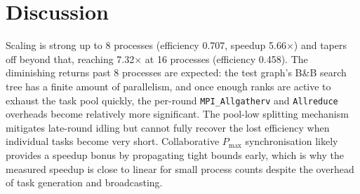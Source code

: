 \documentclass[11pt,a4paper]{article}
\begin{document}
  \section{Discussion}

  Scaling is strong up to 8 processes (efficiency 0.707, speedup 5.66$\times$)
  and tapers off beyond that, reaching 7.32$\times$ at 16 processes
  (efficiency 0.458).  The diminishing returns past 8 processes are expected:
  the test graph's B\&B search tree has a finite amount of parallelism, and once
  enough ranks are active to exhaust the task pool quickly, the per-round
  \texttt{MPI\_Allgatherv} and \texttt{Allreduce} overheads become relatively
  more significant.  The pool-low splitting mechanism mitigates late-round
  idling but cannot fully recover the lost efficiency when individual tasks
  become very short.  Collaborative $P_{\max}$ synchronisation likely provides
  a speedup bonus by propagating tight bounds early, which is why the measured
  speedup is close to linear for small process counts despite the overhead of
  task generation and broadcasting.

  
\end{document}
